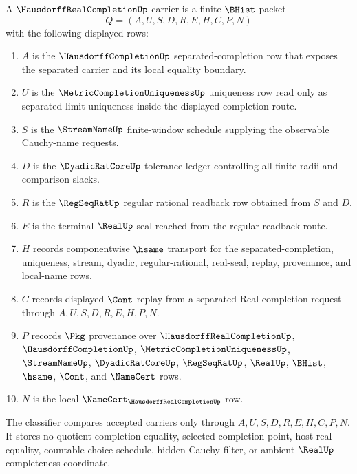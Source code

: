 \begin{definition}
\label{def:hausdorff-real-completion-carrier}
A $\HausdorffRealCompletionUp$ carrier is a finite $\BHist$ packet
$$
Q=(A,U,S,D,R,E,H,C,P,N)
$$
with the following displayed rows:
\begin{enumerate}
\item $A$ is the $\HausdorffCompletionUp$ separated-completion row that exposes the separated carrier and its local equality boundary.
\item $U$ is the $\MetricCompletionUniquenessUp$ uniqueness row read only as separated limit uniqueness inside the displayed completion route.
\item $S$ is the $\StreamNameUp$ finite-window schedule supplying the observable Cauchy-name requests.
\item $D$ is the $\DyadicRatCoreUp$ tolerance ledger controlling all finite radii and comparison slacks.
\item $R$ is the $\RegSeqRatUp$ regular rational readback row obtained from $S$ and $D$.
\item $E$ is the terminal $\RealUp$ seal reached from the regular readback route.
\item $H$ records componentwise $\hsame$ transport for the separated-completion, uniqueness, stream, dyadic, regular-rational, real-seal, replay, provenance, and local-name rows.
\item $C$ records displayed $\Cont$ replay from a separated Real-completion request through $A,U,S,D,R,E,H,P,N$.
\item $P$ records $\Pkg$ provenance over $\HausdorffRealCompletionUp$, $\HausdorffCompletionUp$, $\MetricCompletionUniquenessUp$, $\StreamNameUp$, $\DyadicRatCoreUp$, $\RegSeqRatUp$, $\RealUp$, $\BHist$, $\hsame$, $\Cont$, and $\NameCert$ rows.
\item $N$ is the local $\NameCert_{\HausdorffRealCompletionUp}$ row.
\end{enumerate}
The classifier compares accepted carriers only through $A,U,S,D,R,E,H,C,P,N$. It stores no quotient completion equality, selected completion point, host real equality, countable-choice schedule, hidden Cauchy filter, or ambient $\RealUp$ completeness coordinate.
\end{definition}

